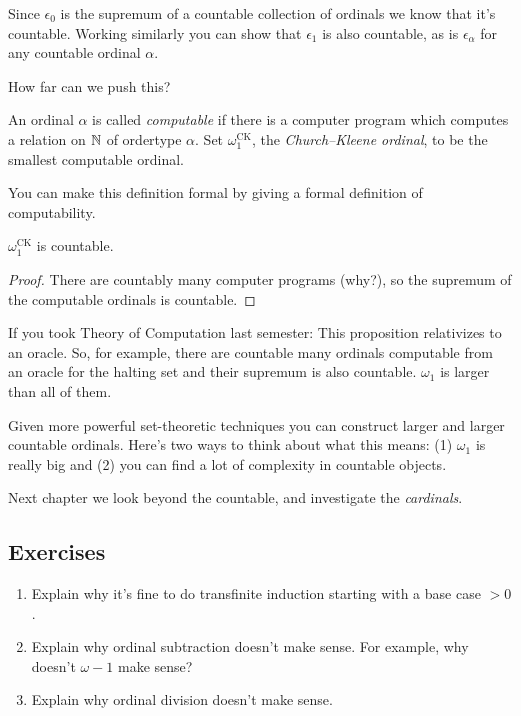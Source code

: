 \documentclass[10pt]{amsart}
\begin{document}
Since $\epsilon_0$ is the supremum of a countable collection of ordinals we know that it's countable. Working similarly you can show that $\epsilon_1$ is also countable, as is $\epsilon_\alpha$ for any countable ordinal $\alpha$.

How far can we push this? 

\begin{definition}[Informal]
An ordinal $\alpha$ is called \emph{computable} if there is a computer program which computes a relation on $\mathbb{N}$ of ordertype $\alpha$. Set $\omega_1^{\mathrm{CK}}$, the \emph{Church--Kleene ordinal}, to be the smallest computable ordinal.
\end{definition}

You can make this definition formal by giving a formal definition of computability. 

\begin{proposition}
$\omega_1^{\mathrm{CK}}$ is countable.
\end{proposition}

\begin{proof}
There are countably many computer programs (why?), so the supremum of the computable ordinals is countable.
\end{proof}

If you took Theory of Computation last semester: This proposition relativizes to an oracle. So, for example, there are countable many ordinals computable from an oracle for the halting set and their supremum is also countable. $\omega_1$ is larger than all of them.

Given more powerful set-theoretic techniques you can construct larger and larger countable ordinals. Here's two ways to think about what this means: (1) $\omega_1$ is really big and (2) you can find a lot of complexity in countable objects.

Next chapter we look beyond the countable, and investigate the \emph{cardinals}.


\subsection*{Exercises}

\begin{enumerate}
\item Explain why it's fine to do transfinite induction starting with a base case $>0$. 
\item Explain why ordinal subtraction doesn't make sense. For example, why doesn't $\omega - 1$ make sense?
\item Explain why ordinal division doesn't make sense.
\end{enumerate}
\end{document}
